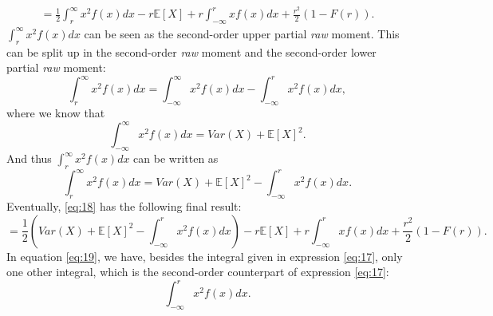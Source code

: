 \documentclass{article}
\begin{document}
\begin{flushleft}
\begin{equation}
\begin{gathered}
            = \frac{1}{2}\int_r^\infty x^2f(x)dx - r\mathbb{E}[X] + r\int_{-\infty}^r xf(x)dx + \frac{r^2}{2}(1-F(r)).
        \end{gathered}
    \end{equation}
    $\int_r^\infty x^2f(x)dx$ can be seen as the second-order upper partial \textit{raw} moment.
    This can be split up in the second-order \textit{raw} moment and the second-order lower partial \textit{raw} moment:
    \begin{equation*}
        \int_r^\infty x^2f(x)dx = \int_{-\infty}^\infty x^2f(x)dx - \int_{-\infty}^r x^2f(x)dx,
    \end{equation*}
    where we know that
    \begin{equation*}
        \int_{-\infty}^\infty x^2f(x)dx = Var(X) + \mathbb{E}[X]^2.
    \end{equation*}
    And thus $\int_r^\infty x^2f(x)dx$ can be written as
    \begin{equation*}
        \int_r^\infty x^2f(x)dx = Var(X) + \mathbb{E}[X]^2- \int_{-\infty}^r x^2f(x)dx.
    \end{equation*}
    Eventually, \ref{eq:18} has the following final result:
    \begin{equation} \label{eq:19}
        = \frac{1}{2}\left(Var(X) + \mathbb{E}[X]^2- \int_{-\infty}^r x^2f(x)dx\right) - r\mathbb{E}[X] + r\int_{-\infty}^r xf(x)dx + \frac{r^2}{2}(1-F(r)).
    \end{equation}
    In equation \ref{eq:19}, we have, besides the integral given in expression \ref{eq:17}, only one other integral, which is the second-order counterpart of expression \ref{eq:17}:
    \begin{equation} \label{eq:20}
        \int_{-\infty}^r x^2f(x)dx.
    \end{equation}
\end{flushleft}
\end{document}

